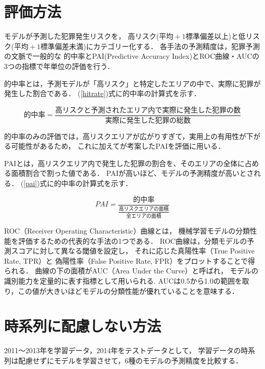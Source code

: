 \documentclass[12pt,a4paper,oneside]{jsbook}
\theoremstyle{plain}
\begin{document}
\section{評価方法}
モデルが予測した犯罪発生リスクを，
高リスク($平均+1標準偏差以上$)と低リスク($平均+1標準偏差未満$)にカテゴリー化する．
各手法の予測精度は，犯罪予測の文脈で一般的な
的中率とPAI(Predictive Accuracy Index)とROC曲線・AUCの3つの指標で年単位の評価を行う．

的中率とは，予測モデルが「高リスク」と特定したエリアの中で、実際に犯罪が発生した割合である．
(\ref{hitrate})式に的中率の計算式を示す．

\begin{equation}\label{hitrate}
  的中率=\frac{高リスクと予測されたエリア内で実際に発生した犯罪の数}{実際に発生した犯罪の総数}
\end{equation}

的中率のみの評価では，高リスクエリアが広がりすぎて，実用上の有用性が下がる可能性があるため，
これに加えて\citet{chainey2008utility}が考案したPAIを評価に用いる．

PAIとは，高リスクエリア内で発生した犯罪の割合を、そのエリアの全体に占める面積割合で割った値である．
PAIが高いほど、モデルの予測精度が高いとされる．
(\ref{pai})式に的中率の計算式を示す．

\begin{equation}\label{pai}
  PAI=\frac{的中率}
  {\frac{高リスクエリアの面積}{全エリアの面積}}
\end{equation}

ROC（Receiver Operating Characteristic）曲線とは，
機械学習モデルの分類性能を評価するための代表的な手法の1つである．
ROC曲線は，分類モデルの予測スコアに対して異なる閾値を設定し，
それに応じた真陽性率（True Positive Rate, TPR）と
偽陽性率（False Positive Rate, FPR）をプロットすることで得られる．
曲線の下の面積がAUC（Area Under the Curve）と呼ばれ，
モデルの識別能力を定量的に表す指標として用いられる.
AUCは0.5から1.0の範囲を取り，この値が大きいほどモデルの分類性能が優れていることを意味する．
\section{時系列に配慮しない方法}
2011〜2013年を学習データ，2014年をテストデータとして，
学習データの時系列は配慮せずにモデルを学習させて，6種のモデルの予測精度を比較する．

\end{document}
